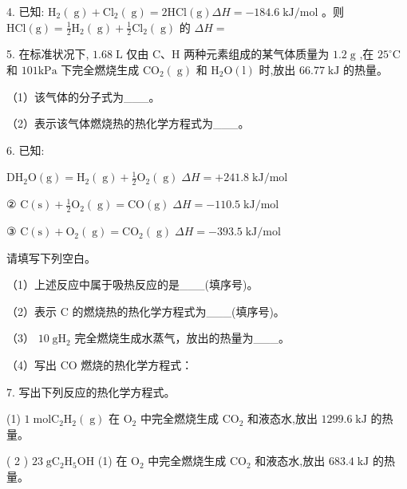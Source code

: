 \documentclass[10pt]{article}
\begin{document}
4. 已知: \({\mathrm{H}}_{2}\left( \mathrm{\;g}\right) + {\mathrm{{Cl}}}_{2}\left( \mathrm{\;g}\right) = 2\mathrm{{HCl}}\left( \mathrm{g}\right) {\Delta H} = - {184.6}\mathrm{\;{kJ}}/\mathrm{{mol}}\) 。则 \(\mathrm{{HCl}}\left( \mathrm{g}\right) = \frac{1}{2}{\mathrm{H}}_{2}\left( \mathrm{\;g}\right) + \frac{1}{2}{\mathrm{{Cl}}}_{2}\left( \mathrm{\;g}\right)\) 的 \({\Delta H} =\)

5. 在标准状况下, \({1.68}\mathrm{\;L}\) 仅由 \(\mathrm{C}\text{、}\mathrm{H}\) 两种元素组成的某气体质量为 \({1.2}\mathrm{\;g}\) ,在 \({25}^{ \circ }\mathrm{C}\) 和 \({101}\mathrm{{kPa}}\) 下完全燃烧生成 \({\mathrm{{CO}}}_{2}\left( \mathrm{\;g}\right)\) 和 \({\mathrm{H}}_{2}\mathrm{O}\left( \mathrm{l}\right)\) 时,放出 \({66.77}\mathrm{\;{kJ}}\) 的热量。

（1）该气体的分子式为\_\_\_。

（2）表示该气体燃烧热的热化学方程式为\_\_\_。

6. 已知:

\({\mathrm{{DH}}}_{2}\mathrm{O}\left( \mathrm{g}\right) = {\mathrm{H}}_{2}\left( \mathrm{\;g}\right) + \frac{1}{2}{\mathrm{O}}_{2}\left( \mathrm{\;g}\right) \;{\Delta H} = + {241.8}\mathrm{\;{kJ}}/\mathrm{{mol}}\)

② \(\mathrm{C}\left( \mathrm{s}\right) + \frac{1}{2}{\mathrm{O}}_{2}\left( \mathrm{\;g}\right) = \mathrm{{CO}}\left( \mathrm{g}\right) \;{\Delta H} = - {110.5}\mathrm{\;{kJ}}/\mathrm{{mol}}\)

③ \(\mathrm{C}\left( \mathrm{s}\right) + {\mathrm{O}}_{2}\left( \mathrm{\;g}\right) = {\mathrm{{CO}}}_{2}\left( \mathrm{\;g}\right) \;{\Delta H} = - {393.5}\mathrm{\;{kJ}}/\mathrm{{mol}}\)

请填写下列空白。

（1）上述反应中属于吸热反应的是\_\_\_(填序号)。

（2）表示 \(\mathrm{C}\) 的燃烧热的热化学方程式为\_\_\_(填序号)。

（3） \({10}\mathrm{\;g}{\mathrm{H}}_{2}\) 完全燃烧生成水蒸气，放出的热量为\_\_\_。

（4）写出 \(\mathrm{{CO}}\) 燃烧的热化学方程式：

7. 写出下列反应的热化学方程式。

(1) \(1\mathrm{\;{mol}}{\mathrm{C}}_{2}{\mathrm{H}}_{2}\left( \mathrm{\;g}\right)\) 在 \({\mathrm{O}}_{2}\) 中完全燃烧生成 \({\mathrm{{CO}}}_{2}\) 和液态水,放出 \({1299.6}\mathrm{\;{kJ}}\) 的热量。

( 2 ) \({23}\mathrm{\;g}{\mathrm{C}}_{2}{\mathrm{H}}_{5}\mathrm{{OH}}\) (1) 在 \({\mathrm{O}}_{2}\) 中完全燃烧生成 \({\mathrm{{CO}}}_{2}\) 和液态水,放出 \({683.4}\mathrm{\;{kJ}}\) 的热量。
\end{document}

